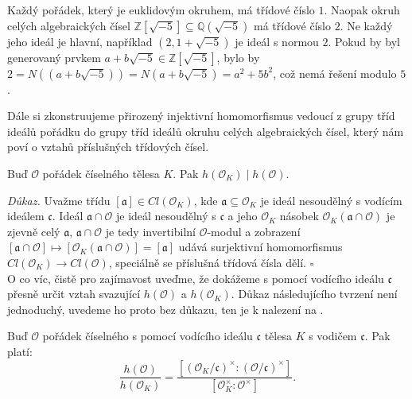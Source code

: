 \documentclass[12pt]{report}
\begin{document}
\begin{priklad}
Každý pořádek, který je euklidovým okruhem, má třídové číslo $1$. Naopak okruh celých algebraických čísel $\mathbb{Z}[\sqrt{-5}] \subseteq \mathbb{Q}(\sqrt{-5})$ má třídové číslo $2$. Ne každý jeho ideál je hlavní, například $(2,1+\sqrt{-5})$ je ideál s normou $2$. Pokud by byl generovaný prvkem $a+b\sqrt{-5} \in \mathbb{Z}[\sqrt{-5}]$, bylo by $2 = N((a+b\sqrt{-5})) = N(a+b\sqrt{-5}) = a^2+5b^2$, což nemá řešení modulo $5$.
\end{priklad}
 
Dále si zkonstruujeme přirozený injektivní homomorfismus vedoucí z grupy tříd ideálů pořádku do grupy tříd ideálů okruhu celých algebraických čísel, který nám poví o vztahů příslušných třídových čísel. 

\begin{veta}
Buď $\mathcal{O}$ pořádek číselného tělesa $K$. Pak $h(\mathcal{O}_K) \mid h(\mathcal{O})$.
\end{veta}
\noindent \textit{Důkaz.} Uvažme třídu $[\mathfrak{a}] \in Cl(\mathcal{O}_K)$, kde $\mathfrak{a} \subseteq \mathcal{O}_K$ je ideál nesoudělný s vodícím ideálem $\mathfrak{c}$. Ideál $\mathfrak{a} \cap \mathcal{O}$ je ideál nesoudělný s $\mathfrak{c}$ a jeho $\mathcal{O}_K$ násobek $\mathcal{O}_K (\mathfrak{a} \cap \mathcal{O})$ je zjevně celý $\mathfrak{a}$, $\mathfrak{a} \cap \mathcal{O}$ je tedy invertibilní $\mathcal{O}$-modul a zobrazení $[\mathfrak{a} \cap \mathcal{O}] \mapsto [\mathcal{O}_K (\mathfrak{a} \cap \mathcal{O})]= [\mathfrak{a}]$ udává surjektivní homomorfismus $Cl(\mathcal{O}_K) \longrightarrow Cl(\mathcal{O})$, speciálně se příslušná třídová čísla dělí. \hfill $\square$\\
 
O co víc, čistě pro zajímavost uveďme, že dokážeme  s pomocí vodícího ideálu $\mathfrak{c}$ přesně určit vztah svazující $h(\mathcal{O})$ a $h(\mathcal{O}_K)$. Důkaz následujícího tvrzení není jednoduchý, uvedeme ho proto bez důkazu, ten je k nalezení na \cite[Thm. 5.2.]{Conrad3}.
\begin{veta} 
Buď $\mathcal{O}$ pořádek číselného s pomocí vodícího ideálu $\mathfrak{c}$ tělesa $K$ s vodičem $\mathfrak{c}$. Pak platí:
\begin{equation*}
\frac{h(\mathcal{O})}{h(\mathcal{O}_K)} = \frac{[(\mathcal{O}_K/\mathfrak{c})^{\times} : (\mathcal{O}/\mathfrak{c})^{\times}]}{[\mathcal{O}_K ^\times : \mathcal{O}^\times]}.
\end{equation*}
\end{veta}
\end{document}

